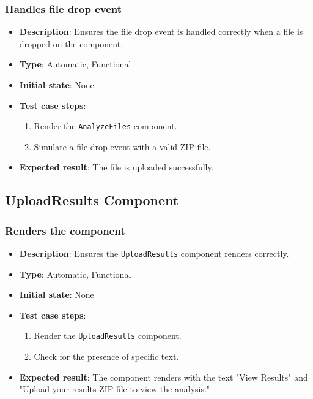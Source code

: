 \documentclass[12pt, titlepage]{article}
\begin{document}
\subsubsection{Handles file drop event}
\begin{itemize}
    \item \textbf{Description}: Ensures the file drop event is handled correctly when a file is dropped on the component.
    \item \textbf{Type}: Automatic, Functional
    \item \textbf{Initial state}: None
    \item \textbf{Test case steps}:
    \begin{enumerate}
        \item Render the \texttt{AnalyzeFiles} component.
        \item Simulate a file drop event with a valid ZIP file.
    \end{enumerate}
    \item \textbf{Expected result}: The file is uploaded successfully.
\end{itemize}

\subsection{UploadResults Component}

\subsubsection{Renders the component}
\begin{itemize}
    \item \textbf{Description}: Ensures the \texttt{UploadResults} component renders correctly.
    \item \textbf{Type}: Automatic, Functional
    \item \textbf{Initial state}: None
    \item \textbf{Test case steps}:
    \begin{enumerate}
        \item Render the \texttt{UploadResults} component.
        \item Check for the presence of specific text.
    \end{enumerate}
    \item \textbf{Expected result}: The component renders with the text "View Results" and "Upload your results ZIP file to view the analysis."
\end{itemize}
\end{document}
